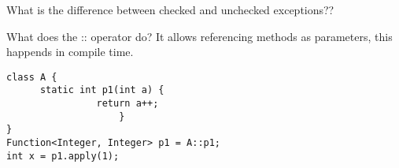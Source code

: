 \begin{flashcard}[Lang]{What is the difference between checked and unchecked exceptions??}
\begin{flashcard}[Lang]{What does the :: operator do?}
It allows referencing methods as parameters, this happends in compile time.

\begin{lstlisting}[frame=single]
class A {
      static int p1(int a) {
                return a++;
                    }
}
Function<Integer, Integer> p1 = A::p1;
int x = p1.apply(1);
\end{lstlisting}

\end{flashcard}


\end{flashcard}


